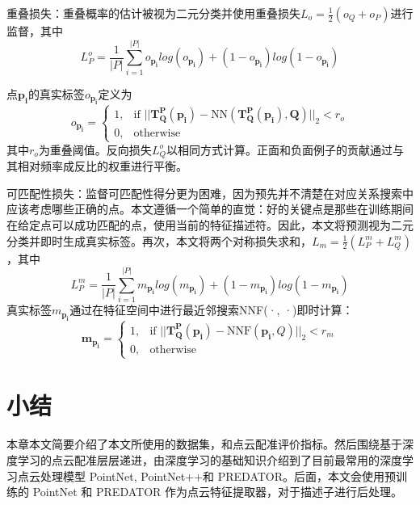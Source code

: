 重叠损失：重叠概率的估计被视为二元分类并使用重叠损失$L_o = \frac{1}{2} (o_Q + o_P)$进行监督，其中
\begin{equation}
L_P^o = \frac{1}{|P|} \sum_{i=1}^{|P|} o_{\boldsymbol{p_i}} log(o_{\boldsymbol{p_i}}) + (1 - o_{\boldsymbol{p_i}}) log(1 - o_{\boldsymbol{p_i}})
\end{equation}

点$\boldsymbol{p_i}$的真实标签$o_{\boldsymbol{p_i}}$定义为
\begin{equation}
    o_{\boldsymbol{p_i}} =
\begin{cases}
1, & \text{if } ||\boldsymbol{T_{Q}^{P}(p_i)} - \text{NN}(\boldsymbol{T_{Q}^{P}(p_i), Q})||_2 < r_o \\
0, & \text{otherwise}
\end{cases}
\end{equation}
其中$r_o$为重叠阈值。反向损失$L_Q^o$以相同方式计算。正面和负面例子的贡献通过与其相对频率成反比的权重进行平衡。

可匹配性损失：监督可匹配性得分更为困难，因为预先并不清楚在对应关系搜索中应该考虑哪些正确的点。本文遵循一个简单的直觉：好的关键点是那些在训练期间在给定点可以成功匹配的点，使用当前的特征描述符。因此，本文将预测视为二元分类并即时生成真实标签。再次，本文将两个对称损失求和，$L_m = \frac{1}{2} (L_P^m + L_Q^m)$，其中
\begin{equation}
L_P^m = \frac{1}{|P|} \sum_{i=1}^{|P|} m_{\boldsymbol{p_i}} log(m_{\boldsymbol{p_i}}) + (1 - m_{\boldsymbol{p_i}}) log(1 - m_{\boldsymbol{p_i}})
\end{equation}
真实标签$m_{\boldsymbol{p_i}}$通过在特征空间中进行最近邻搜索NNF(·, ·)即时计算：
\begin{equation}
\boldsymbol{m_{\boldsymbol{p_i}}} =
\begin{cases}
1, & \text{if } ||\boldsymbol{T_{Q}^{P}({\boldsymbol{p_i}})} - \text{NNF}(\boldsymbol{p_i}, Q)||_2 < r_m \\
0, & \text{otherwise}
\end{cases}
\end{equation}

\section{小结}
本章本文简要介绍了本文所使用的数据集，和点云配准评价指标。然后围绕基于深度学习的点云配准层层递进，由深度学习的基础知识介绍到了目前最常用的深度学习点云处理模型 PointNet, PointNet++和 PREDATOR。后面，本文会使用预训练的 PointNet 和 PREDATOR 作为点云特征提取器，对于描述子进行后处理。